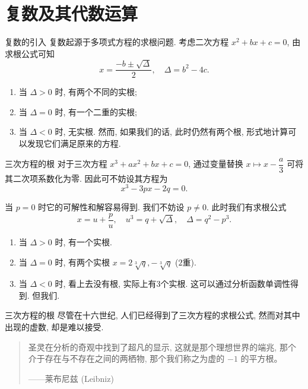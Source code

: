 \section{复数及其代数运算}


\begin{frame}{复数的引入}
\onslide<+->
复数起源于多项式方程的求根问题.
\onslide<+->
考虑二次方程 $x^2+bx+c=0$, 由求根公式可知
\[x=\frac{-b\pm\sqrt\Delta}2,\quad \Delta=b^2-4c.\]
\vspace{-\baselineskip}
\begin{enumerate}
\item 当 $\Delta>0$ 时, 有两个不同的实根;
\item 当 $\Delta=0$ 时, 有一个二重的实根;
\item 当 $\Delta<0$ 时, 无实根.
\onslide<+->
然而, 如果我们的话, 此时仍然有两个根, 形式地计算可以发现它们满足原来的方程.
\end{enumerate}
\end{frame}


\begin{frame}{三次方程的根}
\onslide<+->
对于三次方程 $x^3+ax^2+bx+c=0$,
\onslide<+->
通过变量替换 $x\mapsto x-\dfrac a3$ 可将其二次项系数化为零.
\onslide<+->
因此可不妨设其方程为
\[x^3-3px-2q=0.\]

\onslide<+->
当 $p=0$ 时它的可解性和解容易得到.
\onslide<+->
我们不妨设 $p\neq0$.
\onslide<+->
此时我们有求根公式
\[x=u+\frac pu,\quad u^3=q+\sqrt{\Delta},\quad \Delta=q^2-p^3.\]
\vspace{-\baselineskip}
\begin{enumerate}
\item 当 $\Delta>0$ 时, 有一个实根.
\item 当 $\Delta=0$ 时, 有两个实根 $x=2\sqrt[3]q,-\sqrt[3]q$ ($2$重).
\item 当 $\Delta<0$ 时, 看上去没有根, 实际上有3个实根. 这可以通过分析函数单调性得到.
\onslide<+->
但我们.
\end{enumerate}
\end{frame}


\begin{frame}{三次方程的根}
\onslide<+->
尽管在十六世纪, 人们已经得到了三次方程的求根公式, 然而对其中出现的虚数, 却是难以接受.

\vspace{\baselineskip}
\begin{quote}
圣灵在分析的奇观中找到了超凡的显示, 这就是那个理想世界的端兆, 那个介于存在与不存在之间的两栖物, 那个我们称之为虚的 $−1$ 的平方根。
\begin{flushright}
——莱布尼兹 (Leibniz)
\end{flushright}
\end{quote}
\end{frame}


